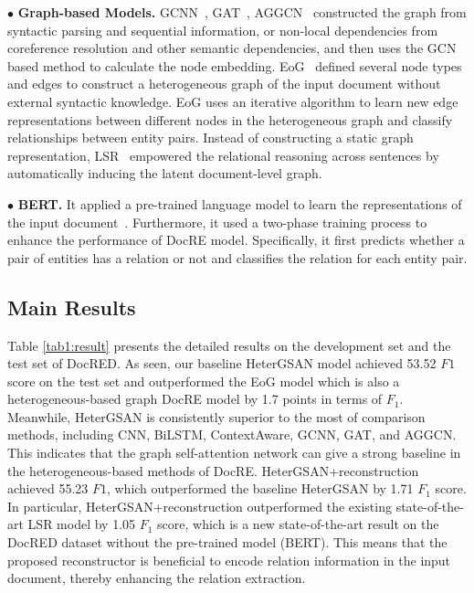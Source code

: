 \documentclass[letterpaper]{article} \usepackage{aaai21}  \usepackage{times}  \usepackage{helvet} \usepackage{courier}  \usepackage[hyphens]{url}  \usepackage{graphicx} \urlstyle{rm} \def\UrlFont{\rm}  \usepackage{natbib}  \usepackage{caption} \frenchspacing  \setlength{\pdfpagewidth}{8.5in}  \setlength{\pdfpageheight}{11in}  \usepackage{amsmath}
\begin{document}
$\bullet$  \textbf{Graph-based Models.}
GCNN~\cite{sahu-etal-2019-inter}, GAT~\cite{Velickovic2018GraphAN}, AGGCN~\cite{guo-etal-2019-attention} constructed the graph from syntactic parsing and sequential information, or non-local dependencies from coreference resolution and other semantic dependencies, and then uses the GCN based method to calculate the node embedding. 
EoG~\cite{Christopoulou2019ConnectingTD} defined several node types and edges to construct a heterogeneous graph of the input document without external syntactic knowledge. EoG uses an iterative algorithm to learn new edge representations between different nodes in the heterogeneous graph and classify relationships between entity pairs. 
Instead of constructing a static graph representation, LSR~\cite{Nan2020ReasoningWL} empowered the relational reasoning across sentences by automatically inducing the latent document-level graph.



$\bullet$  \textbf{BERT.} 
It applied a pre-trained language model to learn the representations of the input document~\cite{Wang2019FinetuneBF,Devlin2019BERTPO}.
Furthermore, it used a two-phase training process to enhance the performance of DocRE model. 
Specifically, it first predicts whether a pair of entities has a relation or not and classifies the relation for each entity pair.

\subsection{Main Results}
Table \ref{tab1:result} presents the detailed results on the development set and the test set of DocRED. 
As seen, our baseline HeterGSAN model achieved 53.52 $F1$ score on the test set and outperformed the EoG model which is also a heterogeneous-based graph DocRE model by 1.7 points in terms of $F_1$.
Meanwhile, HeterGSAN is consistently superior to the most of comparison methods, including CNN, BiLSTM, ContextAware, GCNN, GAT, and AGGCN.
This indicates that the graph self-attention network can give a strong baseline in the heterogeneous-based methods of DocRE.
HeterGSAN+reconstruction achieved 55.23 $F1$, which outperformed the baseline HeterGSAN by 1.71 $F_1$ score.
In particular, HeterGSAN+reconstruction outperformed the existing state-of-the-art LSR model by 1.05 $F_1$ score, which is a new state-of-the-art result on the DocRED dataset without the pre-trained model (BERT).
This means that the proposed reconstructor is beneficial to encode relation information in the input document, thereby enhancing the relation extraction.
\end{document}
